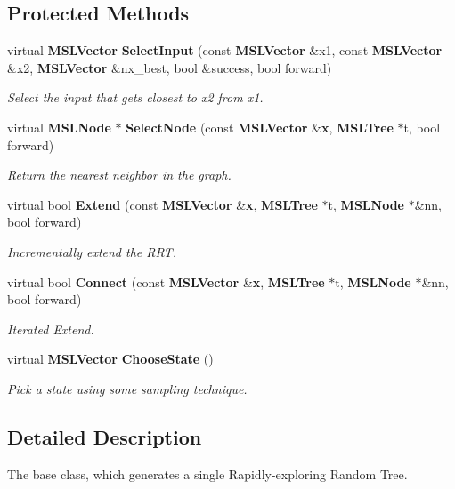 \subsection*{Protected Methods}
\begin{CompactItemize}
\item 
virtual {\bf MSLVector} {\bf Select\-Input} (const {\bf MSLVector} \&x1, const {\bf MSLVector} \&x2, {\bf MSLVector} \&nx\_\-best, bool \&success, bool forward)
\begin{CompactList}\small\item\em Select the input that gets closest to x2 from x1.\item\end{CompactList}\item 
virtual {\bf MSLNode} $\ast$ {\bf Select\-Node} (const {\bf MSLVector} \&{\bf x}, {\bf MSLTree} $\ast$t, bool forward)
\begin{CompactList}\small\item\em Return the nearest neighbor in the graph.\item\end{CompactList}\item 
virtual bool {\bf Extend} (const {\bf MSLVector} \&{\bf x}, {\bf MSLTree} $\ast$t, {\bf MSLNode} $\ast$\&nn, bool forward)
\begin{CompactList}\small\item\em Incrementally extend the RRT.\item\end{CompactList}\item 
virtual bool {\bf Connect} (const {\bf MSLVector} \&{\bf x}, {\bf MSLTree} $\ast$t, {\bf MSLNode} $\ast$\&nn, bool forward)
\begin{CompactList}\small\item\em Iterated Extend.\item\end{CompactList}\item 
virtual {\bf MSLVector} {\bf Choose\-State} ()
\begin{CompactList}\small\item\em Pick a state using some sampling technique.\item\end{CompactList}\end{CompactItemize}


\subsection{Detailed Description}
The base class, which generates a single Rapidly-exploring Random Tree.

